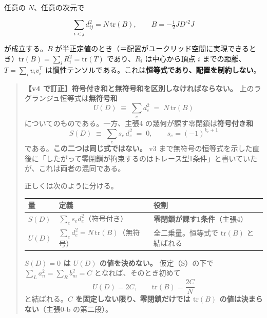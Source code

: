 \documentclass[
  10pt,
]{ltjsarticle}
\newcounter{none} %
\begin{document}
任意の \(N\)、任意の次元で

\[\sum_{i<j} d_{ij}^2 = N\,\mathrm{tr}(B), \qquad B = -\tfrac12 J D^{\circ2} J\]

が成立する。\(B\)
が半正定値のとき（＝配置がユークリッド空間に実現できるとき）\(\mathrm{tr}(B) = \sum_i R_i^2 = \mathrm{tr}(T)\)
であり、\(R_i\) は中心から頂点 \(i\)
までの距離、\(T = \sum_i v_iv_i^{\mathsf T}\)
は慣性テンソルである。これは\textbf{恒等式であり、配置を制約しない}。

\begin{quote}
\textbf{【v4 で訂正】符号付き和と無符号和を区別しなければならない。}
上のラグランジュ恒等式は\textbf{無符号和}
\[U(D) \;\equiv\; \sum_e d_e^2 \;=\; N\,\mathrm{tr}(B)\]
についてのものである。一方、主張4
の幾何が課す零閉鎖は\textbf{符号付き和}
\[S(D) \;\equiv\; \sum_e s_e\,d_e^2 \;=\; 0, \qquad s_e = (-1)^{k_e+1}\]
である。\textbf{この二つは同じ式ではない。} v3
まで無符号の恒等式を示した直後に「したがって零閉鎖が拘束するのはトレース型1条件」と書いていたが、これは両者の混同である。

正しくは次のように分ける。

{\def\LTcaptype{none} %
\begin{longtable}[]{@{}
  >{\raggedright\arraybackslash}p{}
  >{\raggedright\arraybackslash}p{}
  >{\raggedright\arraybackslash}p{}@{}}
\toprule\noalign{}
\begin{minipage}[b]{\linewidth}\raggedright
量
\end{minipage} & \begin{minipage}[b]{\linewidth}\raggedright
定義
\end{minipage} & \begin{minipage}[b]{\linewidth}\raggedright
役割
\end{minipage} \\
\midrule\noalign{}
\endhead
\bottomrule\noalign{}
\endlastfoot
\(S(D)\) & \(\sum_e s_e d_e^2\)（符号付き） &
\textbf{零閉鎖が課す1条件}（主張4） \\
\(U(D)\) & \(\sum_e d_e^2 = N\,\mathrm{tr}(B)\)（無符号） &
全二乗量。恒等式で \(\mathrm{tr}(B)\) と結ばれる \\
\end{longtable}
}

\textbf{\(S(D)=0\) は \(U(D)\) の値を決めない。} 仮定（S）の下で
\(\sum_L a_n^2 = \sum_R b_m^2 = C\) となれば、そのとき初めて
\[U(D) = 2C, \qquad \mathrm{tr}(B) = \frac{2C}{N}\]
と結ばれる。\textbf{\(C\) を固定しない限り、零閉鎖だけでは
\(\mathrm{tr}(B)\) の値は決まらない}（主張0-b の第二段）。


\end{quote}
\end{document}
